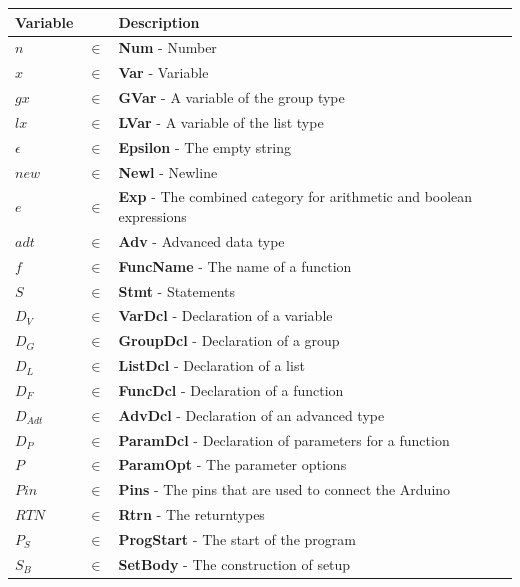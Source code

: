 \begin{table}[H]
\centering
\begin{tabular}{@{}lll@{}}
\toprule
Variable &       & Description                      \\ \midrule
$n$        & $\in$ & \textbf{Num} - Number                     \\
$x$        & $\in$ & \textbf{Var} - Variable                     \\
$gx$        & $\in$ & \textbf{GVar} - A variable of the group type                     \\
$lx$        & $\in$ & \textbf{LVar} - A variable of the list type                     \\
$\epsilon$ & $\in$ & \textbf{Epsilon} - The empty string \\
$new$      & $\in$ &  \textbf{Newl} - Newline                   \\
$e$        & $\in$ & \textbf{Exp} - The combined category for arithmetic and boolean expressions                \\
$adt$        & $\in$ & \textbf{Adv} - Advanced data type                     \\
$f$       & $\in$ & \textbf{FuncName} - The name of a function      \\
$S$        & $\in$ & \textbf{Stmt} - Statements               \\
$D_V$       & $\in$ & \textbf{VarDcl} - Declaration of a variable \\
$D_G$       & $\in$ & \textbf{GroupDcl} - Declaration of a group \\
$D_L$       & $\in$ & \textbf{ListDcl} - Declaration of a list \\
$D_F$       & $\in$ & \textbf{FuncDcl} - Declaration of a function \\
$D_{Adt}$       & $\in$ & \textbf{AdvDcl} - Declaration of an advanced type      \\
$D_P$       & $\in$ & \textbf{ParamDcl} - Declaration of parameters for a function \\
$P$       & $\in$ & \textbf{ParamOpt} - The parameter options \\
$Pin$      & $\in$ &  \textbf{Pins} - The pins that are used to connect the Arduino \\
$RTN$       & $\in$ & \textbf{Rtrn} - The returntypes \\
$P_S$        & $\in$ & \textbf{ProgStart} - The start of the program \\
$S_B$       & $\in$ & \textbf{SetBody} - The construction of setup      \\

\end{tabular}
\end{table}
